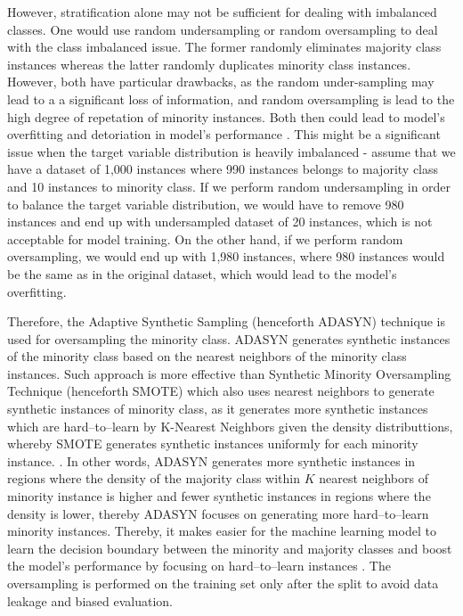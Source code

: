 However, stratification alone may not be sufficient for dealing with imbalanced classes. One would use random undersampling or random oversampling to deal with the class imbalanced issue. The former randomly eliminates majority class instances whereas the latter randomly duplicates minority class instances.
However, both have particular drawbacks, as the random under-sampling may lead to a a significant loss of information, and random oversampling is lead to the high degree of repetation of minority instances. Both then could lead to model's overfitting and detoriation in model's performance \citep{ma2013imbalanced}.
This might be a significant issue when the target variable distribution is heavily imbalanced - assume that we have a dataset of 1,000 instances where 990 instances belongs to majority class and 10 instances to minority class.
If we perform random undersampling in order to balance the target variable distribution, we would have to remove 980 instances and end up with undersampled dataset of 20 instances, which is not acceptable for model training.
On the other hand, if we perform random oversampling, we would end up with 1,980 instances, where 980 instances would be the same as in the original dataset, which would lead to the model's overfitting.

Therefore, the Adaptive Synthetic Sampling (henceforth ADASYN) technique is used for oversampling the minority class.
ADASYN generates synthetic instances of the minority class based on the nearest neighbors of the minority class instances.
Such approach is more effective than Synthetic Minority Oversampling Technique (henceforth SMOTE) which also uses nearest neighbors to generate synthetic instances of minority class, as it generates more synthetic instances which are hard--to--learn by K-Nearest Neighbors given the density distributtions, whereby SMOTE generates synthetic instances uniformly for each minority instance.
 \citep{adasynhaibo}. 
In other words, ADASYN generates more synthetic instances in regions where the density of the majority class within $K$ nearest neighbors of minority instance is higher and fewer synthetic instances in regions where the density is lower, thereby ADASYN focuses on generating more hard--to--learn minority instances.
Thereby, it makes easier for the machine learning model to learn the decision boundary between the minority and majority classes and boost the model's performance by focusing on hard--to--learn instances \citep{adasynhaibo}. 
The oversampling is performed on the training set only after the split to avoid data leakage and biased evaluation.

